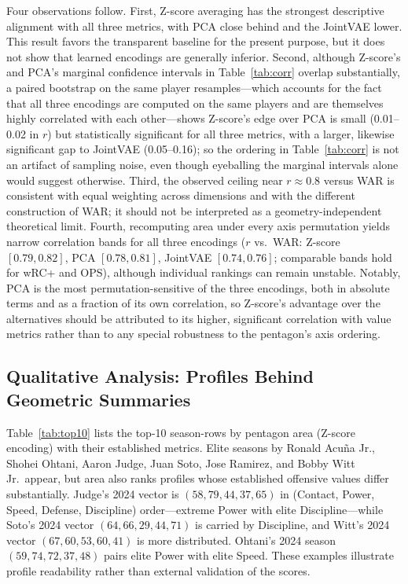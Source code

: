 \documentclass[10pt,twocolumn,letterpaper]{article}
\begin{document}
Four observations follow. First, Z-score averaging has the strongest descriptive alignment with all three metrics, with PCA close behind and the JointVAE lower. This result favors the transparent baseline for the present purpose, but it does not show that learned encodings are generally inferior. Second, although Z-score's and PCA's marginal confidence intervals in Table~\ref{tab:corr} overlap substantially, a paired bootstrap on the same player resamples---which accounts for the fact that all three encodings are computed on the same players and are themselves highly correlated with each other---shows Z-score's edge over PCA is small (0.01--0.02 in $r$) but statistically significant for all three metrics, with a larger, likewise significant gap to JointVAE (0.05--0.16); so the ordering in Table~\ref{tab:corr} is not an artifact of sampling noise, even though eyeballing the marginal intervals alone would suggest otherwise. Third, the observed ceiling near $r \approx 0.8$ versus WAR is consistent with equal weighting across dimensions and with the different construction of WAR; it should not be interpreted as a geometry-independent theoretical limit. Fourth, recomputing area under every axis permutation yields narrow correlation bands for all three encodings ($r$ vs.\ WAR: Z-score $[0.79, 0.82]$, PCA $[0.78, 0.81]$, JointVAE $[0.74, 0.76]$; comparable bands hold for wRC+ and OPS), although individual rankings can remain unstable. Notably, PCA is the most permutation-sensitive of the three encodings, both in absolute terms and as a fraction of its own correlation, so Z-score's advantage over the alternatives should be attributed to its higher, significant correlation with value metrics rather than to any special robustness to the pentagon's axis ordering.

\subsection{Qualitative Analysis: Profiles Behind Geometric Summaries}
Table~\ref{tab:top10} lists the top-10 season-rows by pentagon area (Z-score encoding) with their established metrics. Elite seasons by Ronald Acu\~na Jr., Shohei Ohtani, Aaron Judge, Juan Soto, Jose Ramirez, and Bobby Witt Jr.\ appear, but area also ranks profiles whose established offensive values differ substantially. Judge's 2024 vector is $(58, 79, 44, 37, 65)$ in (Contact, Power, Speed, Defense, Discipline) order---extreme Power with elite Discipline---while Soto's 2024 vector $(64, 66, 29, 44, 71)$ is carried by Discipline, and Witt's 2024 vector $(67, 60, 53, 60, 41)$ is more distributed. Ohtani's 2024 season $(59, 74, 72, 37, 48)$ pairs elite Power with elite Speed. These examples illustrate profile readability rather than external validation of the scores.
\end{document}
